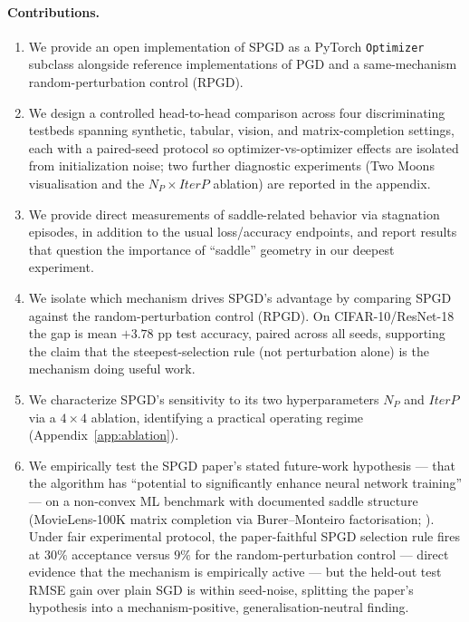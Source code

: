 \documentclass[11pt]{article}
\newcommand{\np}{\ensuremath{N_P}}
\newcommand{\iterp}{\ensuremath{\textit{IterP}}}
\begin{document}
\paragraph{Contributions.}
\begin{enumerate}[leftmargin=*,itemsep=2pt,topsep=2pt]
  \item We provide an open implementation of SPGD as a PyTorch
        \verb|Optimizer| subclass alongside reference implementations
        of PGD and a same-mechanism random-perturbation control (RPGD).
  \item We design a controlled head-to-head comparison across four
        discriminating testbeds spanning synthetic, tabular, vision,
        and matrix-completion settings, each with a paired-seed
        protocol so optimizer-vs-optimizer effects are isolated from
        initialization noise; two further diagnostic experiments
        (Two Moons visualisation and the $\np \times \iterp$
        ablation) are reported in the appendix.
  \item We provide direct measurements of saddle-related behavior via
        stagnation episodes, in addition to the usual loss/accuracy
        endpoints, and report results that question the importance of
        ``saddle'' geometry in our deepest experiment.
  \item We isolate which mechanism drives SPGD's advantage by
        comparing SPGD against the random-perturbation control (RPGD).
        On CIFAR-10/ResNet-18 the gap is mean $+3.78$ pp test accuracy,
        paired across all seeds, supporting the claim that the
        steepest-selection rule (not perturbation alone) is the
        mechanism doing useful work.
  \item We characterize SPGD's sensitivity to its two
        hyper\-parameters \np{} and \iterp{} via a $4 \times 4$
        ablation, identifying a practical operating regime
        (Appendix~\ref{app:ablation}).
  \item We empirically test the SPGD paper's stated future-work
        hypothesis --- that the algorithm has ``potential to
        significantly enhance neural network training''
        \citep[Conclusion]{vahedi2024spgd} --- on a non-convex ML
        benchmark with documented saddle structure (MovieLens-100K
        matrix completion via Burer--Monteiro factorisation;
        \citealp{burer2003nonlinear,ge2016matrix,sun2018geometric}).
        Under fair experimental protocol, the paper-faithful SPGD
        selection rule fires at $30\%$ acceptance versus $9\%$ for
        the random-perturbation control --- direct evidence that the
        mechanism is empirically active --- but the held-out test
        RMSE gain over plain SGD is within seed-noise, splitting the
        paper's hypothesis into a mechanism-positive,
        generalisation-neutral finding.
\end{enumerate}
\end{document}
